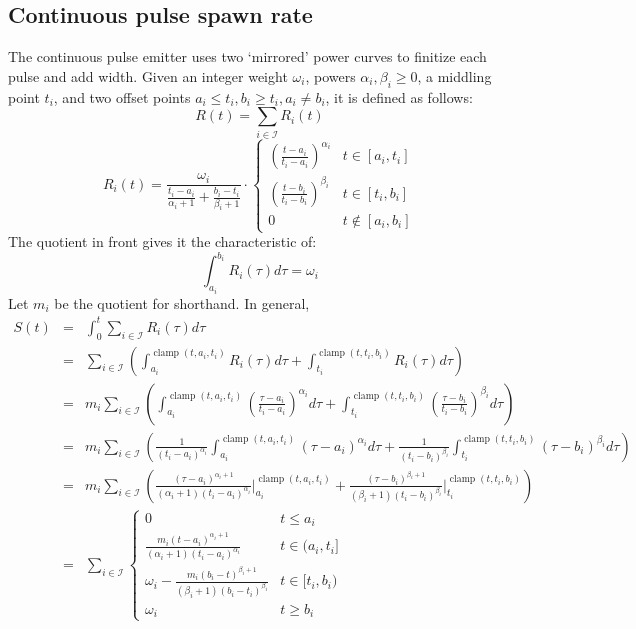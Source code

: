 \documentclass[10pt]{report}
\DeclareMathOperator{\clamp}{clamp}
\begin{document}
\subsection{Continuous pulse spawn rate}
The continuous pulse emitter uses two `mirrored' power curves to finitize each pulse and add width. Given an integer weight $\omega_i$, powers $\alpha_i,\beta_i\geq0$, a middling point $t_i$, and two offset points $a_i\leq t_i,b_i\geq t_i,a_i\neq b_i$, it is defined as follows:
\begin{equation}R(t)=\sum_{i\in\mathcal{I}}R_i(t)\end{equation}
\begin{equation}R_i(t)=\frac{\omega_i}{\frac{t_i-a_i}{\alpha_i+1}+\frac{b_i-t_i}{\beta_i+1}}\cdot\begin{cases}\left(\frac{t-a_i}{t_i-a_i}\right)^{\alpha_i}&t\in[a_i,t_i]\\\left(\frac{t-b_i}{t_i-b_i}\right)^{\beta_i}&t\in[t_i,b_i]\\0&t\not\in[a_i,b_i]\end{cases}\end{equation}
The quotient in front gives it the characteristic of:
\begin{equation}\int_{a_i}^{b_i}R_i(\tau)d\tau=\omega_i\end{equation}
Let $m_i$ be the quotient for shorthand. In general,
\begin{eqnarray}
S(t)&=&\int_0^t\sum_{i\in\mathcal{I}}R_i(\tau)d\tau\\
&=&\sum_{i\in\mathcal{I}}\left(\int_{a_i}^{\clamp(t,a_i,t_i)}R_i(\tau)d\tau+\int_{t_i}^{\clamp(t,t_i,b_i)}R_i(\tau)d\tau\right)\\
&=&m_i\sum_{i\in\mathcal{I}}\left(\int_{a_i}^{\clamp(t,a_i,t_i)}\left(\frac{\tau-a_i}{t_i-a_i}\right)^{\alpha_i}d\tau+\int_{t_i}^{\clamp(t,t_i,b_i)}\left(\frac{\tau-b_i}{t_i-b_i}\right)^{\beta_i}d\tau\right)\\
&=&m_i\sum_{i\in\mathcal{I}}\left(\frac{1}{(t_i-a_i)^{\alpha_i}}\int_{a_i}^{\clamp(t,a_i,t_i)}(\tau-a_i)^{\alpha_i}d\tau+\frac{1}{(t_i-b_i)^{\beta_i}}\int_{t_i}^{\clamp(t,t_i,b_i)}(\tau-b_i)^{\beta_i}d\tau\right)\\
&=&m_i\sum_{i\in\mathcal{I}}\left(\frac{(\tau-a_i)^{\alpha_i+1}}{(\alpha_i+1)(t_i-a_i)^{\alpha_i}}\Big|_{a_i}^{\clamp(t,a_i,t_i)}+\frac{(\tau-b_i)^{\beta_i+1}}{(\beta_i+1)(t_i-b_i)^{\beta_i}}\Big|_{t_i}^{\clamp(t,t_i,b_i)}\right)\\
&=&\sum_{i\in\mathcal{I}}\begin{cases}
0&t\leq a_i\\
\frac{m_i(t-a_i)^{\alpha_i+1}}{(\alpha_i+1)(t_i-a_i)^{\alpha_i}}&t\in(a_i,t_i]\\
\omega_i-\frac{m_i(b_i-t)^{\beta_i+1}}{(\beta_i+1)(b_i-t_i)^{\beta_i}}&t\in[t_i,b_i)\\
\omega_i&t\geq b_i
\end{cases}
\end{eqnarray}
\end{document}
